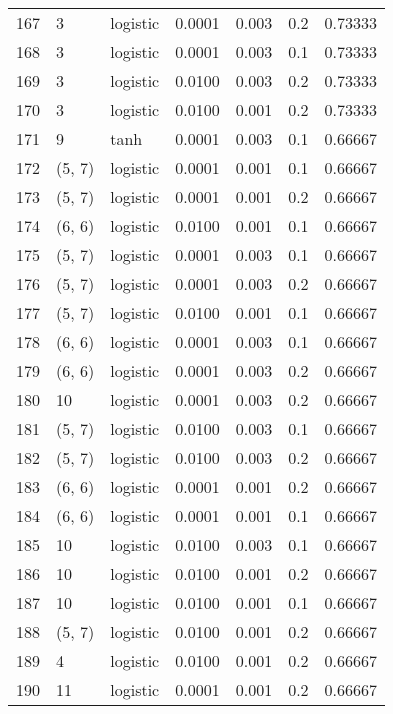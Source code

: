 \begin{tabular}{lllrrrr}
167 &           3 &  logistic &  0.0001 &  0.003 &  0.2 &   0.73333 \\
168 &           3 &  logistic &  0.0001 &  0.003 &  0.1 &   0.73333 \\
169 &           3 &  logistic &  0.0100 &  0.003 &  0.2 &   0.73333 \\
170 &           3 &  logistic &  0.0100 &  0.001 &  0.2 &   0.73333 \\
171 &           9 &      tanh &  0.0001 &  0.003 &  0.1 &   0.66667 \\
172 &      (5, 7) &  logistic &  0.0001 &  0.001 &  0.1 &   0.66667 \\
173 &      (5, 7) &  logistic &  0.0001 &  0.001 &  0.2 &   0.66667 \\
174 &      (6, 6) &  logistic &  0.0100 &  0.001 &  0.1 &   0.66667 \\
175 &      (5, 7) &  logistic &  0.0001 &  0.003 &  0.1 &   0.66667 \\
176 &      (5, 7) &  logistic &  0.0001 &  0.003 &  0.2 &   0.66667 \\
177 &      (5, 7) &  logistic &  0.0100 &  0.001 &  0.1 &   0.66667 \\
178 &      (6, 6) &  logistic &  0.0001 &  0.003 &  0.1 &   0.66667 \\
179 &      (6, 6) &  logistic &  0.0001 &  0.003 &  0.2 &   0.66667 \\
180 &          10 &  logistic &  0.0001 &  0.003 &  0.2 &   0.66667 \\
181 &      (5, 7) &  logistic &  0.0100 &  0.003 &  0.1 &   0.66667 \\
182 &      (5, 7) &  logistic &  0.0100 &  0.003 &  0.2 &   0.66667 \\
183 &      (6, 6) &  logistic &  0.0001 &  0.001 &  0.2 &   0.66667 \\
184 &      (6, 6) &  logistic &  0.0001 &  0.001 &  0.1 &   0.66667 \\
185 &          10 &  logistic &  0.0100 &  0.003 &  0.1 &   0.66667 \\
186 &          10 &  logistic &  0.0100 &  0.001 &  0.2 &   0.66667 \\
187 &          10 &  logistic &  0.0100 &  0.001 &  0.1 &   0.66667 \\
188 &      (5, 7) &  logistic &  0.0100 &  0.001 &  0.2 &   0.66667 \\
189 &           4 &  logistic &  0.0100 &  0.001 &  0.2 &   0.66667 \\
190 &          11 &  logistic &  0.0001 &  0.001 &  0.2 &   0.66667 \\

\end{tabular}
